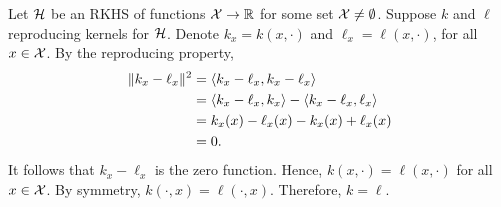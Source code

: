 Let \(\mathcal{H}\) be an RKHS of functions \(\mathcal{X} \to \mathbb{R}\) for some set \(\mathcal{X} \neq \emptyset\).
Suppose \(k\) and \(\ell\) reproducing kernels for \(\mathcal{H}\).
Denote \(k_x = k(x,\cdot)\) and \(\ell_x = \ell(x, \cdot)\), for all \(x \in \mathcal{X}\).
By the reproducing property,
\begin{align}
    \|k_x - \ell_x\|^2
    &= \left\langle k_x - \ell_x, k_x - \ell_x \right\rangle\\
    \notag
    &= \left\langle k_x - \ell_x, k_x \right\rangle - \left\langle k_x - \ell_x, \ell_x \right\rangle\\
    \notag
    &= k_x(x) - \ell_x(x) - k_x(x) + \ell_x(x)\\
    \notag
    &= 0.
\end{align}
It follows that \(k_x - \ell_x\) is the zero function.
Hence, \(k(x,\cdot) = \ell(x,\cdot)\) for all \(x \in \mathcal{X}\).
By symmetry, \(k(\cdot, x) = \ell(\cdot, x)\).
Therefore, \(k = \ell\).